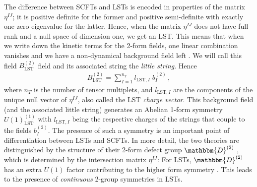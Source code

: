 \documentclass[11pt]{article}
\numberwithin{equation}{section}
\newcommand{\LST}{\text{LST}\xspace}
\begin{document}
The difference between SCFTs and LSTs is encoded in properties of the matrix $\eta^{IJ}$; it is positive definite for the former and positive semi-definite with exactly one zero eigenvalue for the latter. Hence, when the matrix $\eta^{IJ}$ does not have full rank and a null space of dimension one, we get an LST. This means that when we write down the kinetic terms for the 2-form fields, one linear combination vanishes and we have a non-dynamical background field left \cite{Bhardwaj:2015xxa}. We will call this field $B_{\LST}^{(2)}$ field and its associated string the \textit{little string}. Hence 
\begin{align}
\label{tensorrelation}
B_{\LST}^{(2)}=\sum_{I=1}^{n_{T}}l_{\LST,I}\; b_{I}^{(2)} \, ,
\end{align}
where $n_T$ is the number of tensor multiplets, and $l_{\LST,I}$ are the components of the unique null vector of $\eta^{IJ}$, also called the LST \textit{charge vector}. This background field (and the associated little string) generates an Abelian 1-form symmetry $U(1)^{(1)}_{\LST}$ with $l_{\LST,I}$
being the respective charges of the strings that couple to the fields $b_{I}^{(2)}$. The presence of such a symmetry is an important point of differentiation between LSTs and SCFTs. In more detail, the two theories are distinguished by the structure of their 2-form defect group $\mathbbm{D}^{(2)}$ \cite{DelZotto:2015isa,Cordova:2018cvg}, which is determined by the intersection matrix $\eta^{IJ}$: For LSTs, $\mathbbm{D}^{(2)}$ has an extra $U(1)$ factor contributing to the higher form symmetry \cite{Bhardwaj:2020phs,Cordova:2020tij}. This leads to the presence of \textit{continuous} 2-group symmetries in LSTs. 
\end{document}
